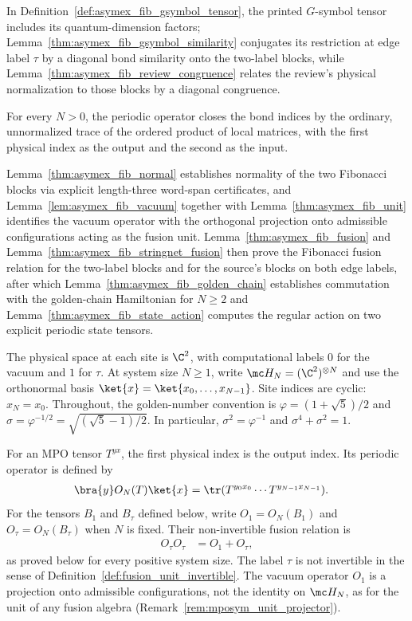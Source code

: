 In Definition~\ref{def:asymex_fib_gsymbol_tensor}, the printed
$G$-symbol tensor includes its quantum-dimension factors;
Lemma~\ref{thm:asymex_fib_gsymbol_similarity} conjugates its
restriction at edge label $\tau$ by a diagonal bond similarity onto the
two-label blocks, while Lemma~\ref{thm:asymex_fib_review_congruence}
relates the review's physical normalization to those blocks by a
diagonal congruence.

For every $N>0$, the periodic operator closes the bond indices by the
ordinary, unnormalized trace of the ordered product of local matrices,
with the first physical index as the output and the second as the input.

Lemma~\ref{thm:asymex_fib_normal} establishes normality of the two
Fibonacci blocks via explicit length-three word-span certificates, and
Lemma~\ref{lem:asymex_fib_vacuum} together with
Lemma~\ref{thm:asymex_fib_unit} identifies the vacuum operator with
the orthogonal projection onto admissible configurations acting as the
fusion unit. Lemma~\ref{thm:asymex_fib_fusion} and
Lemma~\ref{thm:asymex_fib_stringnet_fusion} then prove the Fibonacci
fusion relation for the two-label blocks and for the source's blocks on
both edge labels, after which Lemma~\ref{thm:asymex_fib_golden_chain}
establishes commutation with the golden-chain Hamiltonian for $N\geq2$
and Lemma~\ref{thm:asymex_fib_state_action} computes the regular
action on two explicit periodic state tensors.

The physical space at each site is $\C^2$, with computational labels
$0$ for the vacuum and $1$ for $\tau$. At system size $N\geq1$, write
$\mc H_N=(\C^2)^{\otimes N}$ and use the orthonormal basis
$\ket{x}=\ket{x_0,\ldots,x_{N-1}}$. Site indices are cyclic:
$x_N=x_0$. Throughout, the golden-number convention is
$\varphi=(1+\sqrt5)/2$ and
$\sigma=\varphi^{-1/2}=\sqrt{(\sqrt5-1)/2}$.
In particular, $\sigma^2=\varphi^{-1}$ and
$\sigma^4+\sigma^2=1$.

For an MPO tensor $T^{yx}$, the first physical index is the output
index. Its periodic operator is defined by
\begin{align}
    \bra{y}O_N(T)\ket{x}
     & =\tr(T^{y_0x_0}\cdots T^{y_{N-1}x_{N-1}}).
    \label{eq:asymex_fib_periodic}
\end{align}
For the tensors $B_1$ and $B_\tau$ defined below, write
$O_1=O_N(B_1)$ and $O_\tau=O_N(B_\tau)$ when $N$ is fixed.
Their non-invertible fusion relation is
\begin{align}
    O_\tau O_\tau & =O_1+O_\tau,
    \label{eq:asymex_fib_fusion}
\end{align}
as proved below for every positive system size. The label $\tau$ is not
invertible in the sense of Definition~\ref{def:fusion_unit_invertible}. The
vacuum operator $O_1$ is a projection onto admissible configurations, not
the identity on $\mc H_N$, as for the unit of any fusion algebra
(Remark~\ref{rem:mposym_unit_projector}).

